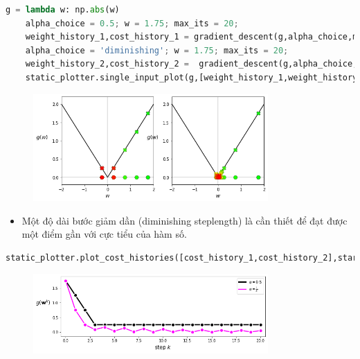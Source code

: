 \documentclass{book}
\begin{document}
\begin{lstlisting}[language=python]
    g = lambda w: np.abs(w)
    alpha_choice = 0.5; w = 1.75; max_its = 20;
    weight_history_1,cost_history_1 = gradient_descent(g,alpha_choice,max_its,w)
    alpha_choice = 'diminishing'; w = 1.75; max_its = 20;
    weight_history_2,cost_history_2 =  gradient_descent(g,alpha_choice,max_its,w)
    static_plotter.single_input_plot(g,[weight_history_1,weight_history_2],[cost_history_1,cost_history_2],wmin = -2,wmax = 2,onerun_perplot = True)
\end{lstlisting}
\begin{figure}[H]
    \centering
    \includegraphics[width=0.8\textwidth]{images/fixed_and_dimishing_steplength_selection_single_input_convex.png}
\end{figure}
\begin{itemize}
    \item Một độ dài bước giảm dần (diminishing steplength) là cần thiết để đạt được một điểm gần với cực tiểu của hàm số.
\end{itemize}
\begin{lstlisting}[language=python]
    static_plotter.plot_cost_histories([cost_history_1,cost_history_2],start = 0,points = True,labels = [r'$\alpha = 0.5$',r'$\alpha = \frac{1}{k}$'])
\end{lstlisting}
\begin{figure}[H]
    \centering
    \includegraphics[width=0.8\textwidth]{images/fixed_and_dimishing_steplength_selection_single_input_convex_his.png}
\end{figure}
\end{document}
